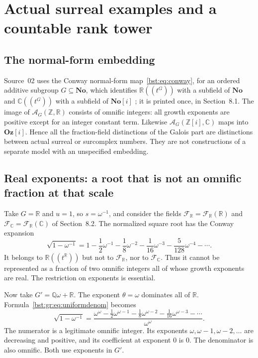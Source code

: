 \documentclass[11pt,letterpaper]{article}
\theoremstyle{definition}
\theoremstyle{remark}
\newcommand{\Q}{\mathbb Q}
\newcommand{\R}{\mathbb R}
\newcommand{\C}{\mathbb C}
\newcommand{\Z}{\mathbb Z}
\newcommand{\No}{\mathbf{No}}
\newcommand{\HH}[2]{#1((t^{#2}))}
\newcommand{\FF}[2]{\mathcal F_{#2}(#1)}
\newcommand{\Oz}{\mathbf{Oz}}
\newcommand{\AAG}[3]{\mathcal A_{#3}(#1,#2)}
\begin{document}
\section{Actual surreal examples and a countable rank tower}\label{bst:gr:sec:surreal}

\subsection{The normal-form embedding}

Source~02 uses the Conway normal-form map~\eqref{bst:eq:conway}, for an
ordered additive subgroup $G\subseteq\No$, which identifies $\HH{\R}G$ with a
subfield of $\No$ and $\HH{\C}G$ with a subfield of $\No[i]$
\cite{Conway,Gonshor,LM24}; it is printed once, in Section~8.1. The image of
$\AAG{\Z}{\R}G$ consists of omnific integers: all growth exponents are
positive except for an integer constant term. Likewise $\AAG{\Z[i]}{\C}G$
maps into $\Oz[i]$. Hence all the fraction-field distinctions of the Galois
part are distinctions between actual surreal or surcomplex numbers. They are
not constructions of a separate model with an unspecified embedding.

\subsection{Real exponents: a root that is not an omnific fraction at that scale}

Take $G=\R$ and $u=1$, so $s=\omega^{-1}$, and consider the fields
$\mathscr F_\R=\FF{\R}{\R}$ and $\mathscr F_\C=\FF{\C}{\R}$ of Section~8.2.
The normalized square root has the Conway expansion
\begin{equation}\label{bst:gr:eq:sqrtconway}
 \sqrt{1-\omega^{-1}}
 =1-\frac12\omega^{-1}-\frac18\omega^{-2}
 -\frac1{16}\omega^{-3}-\frac5{128}\omega^{-4}-\cdots.
\end{equation}
It belongs to $\HH{\R}{\R}$ but not to $\mathscr F_\R$, nor to $\mathscr F_\C$.
Thus it cannot be represented as a fraction of two omnific integers all of
whose growth exponents are real. The restriction on exponents is essential.

Now take $G'=\Q\omega+\R$. The exponent $\theta=\omega$ dominates all of $\R$.
Formula~\eqref{bst:gr:eq:uniformdenom} becomes
\begin{equation}\label{bst:gr:eq:explicitquotient}
 \sqrt{1-\omega^{-1}}
 =\frac{\displaystyle
   \omega^\omega-\frac12\omega^{\omega-1}
    -\frac18\omega^{\omega-2}-\frac1{16}\omega^{\omega-3}
    -\cdots}{\omega^\omega}.
\end{equation}
The numerator is a legitimate omnific integer. Its exponents
$\omega,\omega-1,\omega-2,\ldots$ are decreasing and positive, and its
coefficient at exponent $0$ is $0$. The denominator is also omnific. Both use
exponents in $G'$.
\end{document}
